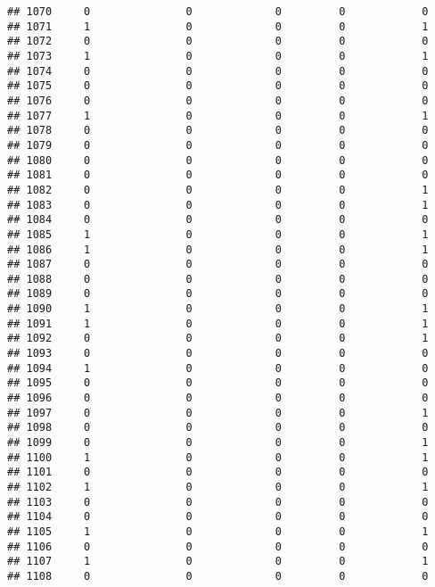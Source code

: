 \documentclass[]{article}
\begin{document}
\begin{verbatim}
## 1070     0               0             0         0            0
## 1071     1               0             0         0            1
## 1072     0               0             0         0            0
## 1073     1               0             0         0            1
## 1074     0               0             0         0            0
## 1075     0               0             0         0            0
## 1076     0               0             0         0            0
## 1077     1               0             0         0            1
## 1078     0               0             0         0            0
## 1079     0               0             0         0            0
## 1080     0               0             0         0            0
## 1081     0               0             0         0            0
## 1082     0               0             0         0            1
## 1083     0               0             0         0            1
## 1084     0               0             0         0            0
## 1085     1               0             0         0            1
## 1086     1               0             0         0            1
## 1087     0               0             0         0            0
## 1088     0               0             0         0            0
## 1089     0               0             0         0            0
## 1090     1               0             0         0            1
## 1091     1               0             0         0            1
## 1092     0               0             0         0            1
## 1093     0               0             0         0            0
## 1094     1               0             0         0            0
## 1095     0               0             0         0            0
## 1096     0               0             0         0            0
## 1097     0               0             0         0            1
## 1098     0               0             0         0            0
## 1099     0               0             0         0            1
## 1100     1               0             0         0            1
## 1101     0               0             0         0            0
## 1102     1               0             0         0            1
## 1103     0               0             0         0            0
## 1104     0               0             0         0            0
## 1105     1               0             0         0            1
## 1106     0               0             0         0            0
## 1107     1               0             0         0            1
## 1108     0               0             0         0            0

\end{verbatim}
\end{document}
